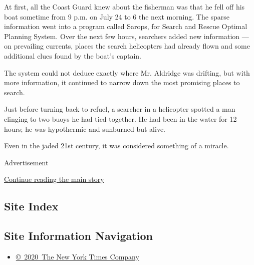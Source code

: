 At first, all the Coast Guard knew about the fisherman was that he fell
off his boat sometime from 9 p.m. on July 24 to 6 the next morning. The
sparse information went into a program called Sarops, for Search and
Rescue Optimal Planning System. Over the next few hours, searchers added
new information --- on prevailing currents, places the search
helicopters had already flown and some additional clues found by the
boat's captain.

The system could not deduce exactly where Mr. Aldridge was drifting, but
with more information, it continued to narrow down the most promising
places to search.

Just before turning back to refuel, a searcher in a helicopter spotted a
man clinging to two buoys he had tied together. He had been in the water
for 12 hours; he was hypothermic and sunburned but alive.

Even in the jaded 21st century, it was considered something of a
miracle.

Advertisement

\protect\hyperlink{after-bottom}{Continue reading the main story}

\hypertarget{site-index}{%
\subsection{Site Index}\label{site-index}}

\hypertarget{site-information-navigation}{%
\subsection{Site Information
Navigation}\label{site-information-navigation}}

\begin{itemize}
\tightlist
\item
  \href{https://help.nytimes.com/hc/en-us/articles/115014792127-Copyright-notice}{©~2020~The
  New York Times Company}
\end{itemize}

